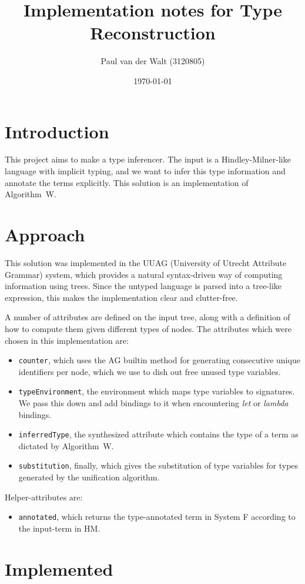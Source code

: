 \documentclass[a4paper]{article}
\author{Paul van der Walt (3120805)}
\date{\today}
\title{Implementation notes for Type Reconstruction}
\begin{document}
\maketitle
\tableofcontents

\section{Introduction}

This project aims to make a type inferencer. The input is a Hindley-Milner-like language with implicit typing, and we want to infer this type information and annotate the terms explicitly. This solution is an implementation of Algorithm~W. 

\section{Approach}

This solution was implemented in the UUAG (University of Utrecht Attribute Grammar) system, which provides a natural syntax-driven way of computing information using trees. Since the untyped language is parsed into a tree-like expression, this makes the implementation clear and clutter-free.

A number of attributes are defined on the input tree, along with a definition of how to compute them given different types of nodes. The attributes which were chosen in this implementation are:

\begin{itemize}
    \item \texttt{counter}, which uses the AG builtin method for generating consecutive unique identifiers per node, which we use to dish out free unused type variables.
    \item \texttt{typeEnvironment}, the environment which maps type variables to signatures. We pass this down and add bindings to it when encountering \emph{let} or \emph{lambda} bindings. 
    \item \texttt{inferredType}, the synthesized attribute which contains the type of a term as dictated by Algorithm~W. 
    \item \texttt{substitution}, finally, which gives the substitution of type variables for types generated by the unification algorithm. 
\end{itemize}

Helper-attributes are: 

\begin{itemize}
    \item \texttt{annotated}, which returns the type-annotated term in System F according to the input-term in HM.
\end{itemize}




\section{Implemented}
\end{document}
